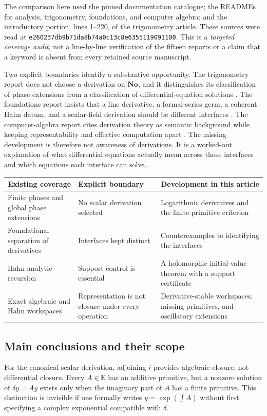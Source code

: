 \documentclass[11pt,letterpaper]{article}
\numberwithin{equation}{section}
\theoremstyle{definition}
\theoremstyle{remark}
\newcommand{\No}{\mathbf{No}}
\newcommand{\K}{\mathbb K}
\newcommand{\revision}{\texttt{e260237db9b71da8b74a0c13c8e6355119091100}}
\begin{document}
The comparison here used the pinned documentation catalogue; the READMEs for analysis, trigonometry, foundations, and computer algebra; and the introductory portion, lines 1--220, of the trigonometry article. These sources were read at \revision. This is a \emph{targeted coverage audit}, not a line-by-line verification of the fifteen reports or a claim that a keyword is absent from every retained source manuscript.

Two explicit boundaries identify a substantive opportunity. The trigonometry report does not choose a derivation on $\No$, and it distinguishes its classification of phase extensions from a classification of differential-equation solutions \cite{RepoTrig}. The foundations report insists that a fine derivative, a formal-series germ, a coherent Hahn datum, and a scalar-field derivation should be different interfaces \cite{RepoFound}. The computer-algebra report cites derivation theory as semantic background while keeping representability and effective computation apart \cite{RepoCAS}. The missing development is therefore not awareness of derivations. It is a worked-out explanation of what differential equations actually mean across those interfaces and which equations each interface can solve.

\begin{center}\small
\begin{tabular}{L{0.24\textwidth}L{0.32\textwidth}L{0.34\textwidth}}
\toprule
Existing coverage & Explicit boundary & Development in this article\\
\midrule
Finite phases and global phase extensions & No scalar derivation selected & Logarithmic derivatives and the finite-primitive criterion\\
Foundational separation of derivatives & Interfaces kept distinct & Counterexamples to identifying the interfaces\\
Hahn analytic recursion & Support control is essential & A holomorphic initial-value theorem with a support certificate\\
Exact algebraic and Hahn workspaces & Representation is not closure under every operation & Derivative-stable workspaces, missing primitives, and oscillatory extensions\\
\bottomrule
\end{tabular}
\end{center}

\subsection{Main conclusions and their scope}
For the canonical scalar derivation, adjoining $i$ provides algebraic closure, not differential closure. Every $A\in\K$ has an additive primitive, but a nonzero solution of $\delta y=Ay$ exists only when the imaginary part of $A$ has a finite primitive. This distinction is invisible if one formally writes $y=\exp(\int A)$ without first specifying a complex exponential compatible with $\delta$.
\end{document}
